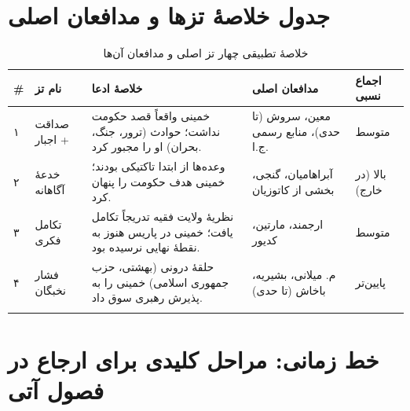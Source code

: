 \documentclass[12pt,a4paper]{book}
\begin{document}
\section{جدول خلاصهٔ تزها و مدافعان اصلی}

\begin{longtable}{%
    >{\centering\arraybackslash}p{}
    >{\raggedleft\arraybackslash}p{}
    >{\raggedleft\arraybackslash}p{}
    >{\raggedleft\arraybackslash}p{}
    >{\centering\arraybackslash}p{}}
\toprule
\rowcolor{cPrimary!15}
\textbf{\#} & \textbf{نام تز} & \textbf{خلاصهٔ ادعا} & \textbf{مدافعان اصلی} & \textbf{اجماع نسبی} \\
\midrule
\endhead

\cellcolor{cGreen!10} ۱ &
\cellcolor{cGreen!10} صداقت + اجبار &
\cellcolor{cGreen!10} خمینی واقعاً قصد حکومت نداشت؛ حوادث (ترور، جنگ، بحران) او را مجبور کرد. &
\cellcolor{cGreen!10} معین، سروش (تا حدی)، منابع رسمی ج.ا. &
\cellcolor{cGreen!10} \textcolor{cGreen}{متوسط} \\
\midrule

\cellcolor{cAccent!8} ۲ &
\cellcolor{cAccent!8} خدعهٔ آگاهانه &
\cellcolor{cAccent!8} وعده‌ها از ابتدا تاکتیکی بودند؛ خمینی هدف حکومت را پنهان کرد. &
\cellcolor{cAccent!8} آبراهامیان، گنجی، بخشی از کاتوزیان &
\cellcolor{cAccent!8} \textcolor{cAccent}{بالا (در خارج)} \\
\midrule

\cellcolor{cGold!10} ۳ &
\cellcolor{cGold!10} تکامل فکری &
\cellcolor{cGold!10} نظریهٔ ولایت فقیه تدریجاً تکامل یافت؛ خمینی در پاریس هنوز به نقطهٔ نهایی نرسیده بود. &
\cellcolor{cGold!10} ارجمند، مارتین، کدیور &
\cellcolor{cGold!10} \textcolor{cGold}{متوسط} \\
\midrule

\cellcolor{cConsolid!8} ۴ &
\cellcolor{cConsolid!8} فشار نخبگان &
\cellcolor{cConsolid!8} حلقهٔ درونی (بهشتی، حزب جمهوری اسلامی) خمینی را به پذیرش رهبری سوق داد. &
\cellcolor{cConsolid!8} م. میلانی، بشیریه، باخاش (تا حدی) &
\cellcolor{cConsolid!8} \textcolor{cConsolid}{پایین‌تر} \\

\bottomrule
\caption{خلاصهٔ تطبیقی چهار تز اصلی و مدافعان آن‌ها}
\label{tab:theses-summary}
\end{longtable}

\section{خط زمانی: مراحل کلیدی برای ارجاع در فصول آتی}
\end{document}
